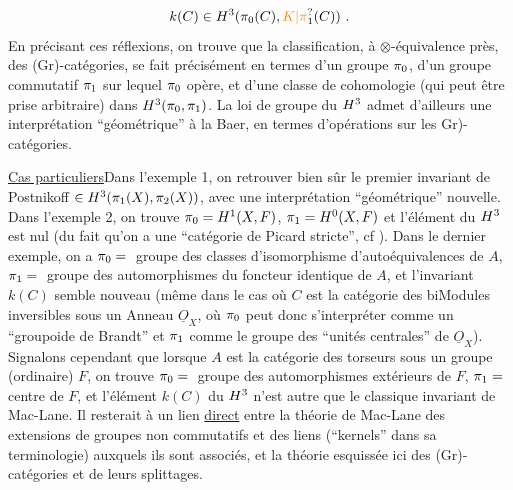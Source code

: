 
\[
k(C)\handwritten{\in}H^{\handwritten{3}}(\handwritten{\pi}_{0}(C),\handwritten{\unsure{K|\pi}}_{1}(C))\ .
\]
En précisant ces réflexions, on trouve que la classification, à $\otimes$-équivalence près, des (Gr)-catégories, se fait précisément en termes d'un groupe $\pi_{0}$, d'un groupe commutatif $\pi_{1}$ sur lequel $\pi_{0}$ opère, et d'une classe de cohomologie (qui peut être prise arbitraire) dans $H^{3}(\pi_{0},\pi_{1})$. La loi de  groupe du $H^{3}$ admet d'ailleurs une interprétation ``géométrique'' à la Baer, en termes d'opérations sur les \handwritten{(}Gr)-catégories.

\uline{Cas particuliers}\quad Dans l'exemple 1, on  retrouver bien sûr le premier invariant de Postnikoff $\in H^{3}(\pi_{1}(X),\pi_{2}(X))$, avec une interprétation ``géo\deleted{(}métrique'' nouvelle. Dans l'exemple 2, on trouve $\pi_{0}=H^{1}(X,F)$, $\pi_{1}=H^{0}(X,F)$\handwritten{,} et l'élément du $H^{3}$ est nul (du fait qu'on a une ``catégorie de Picard stricte'', cf \handwritten{[\, ]}). Dans  le dernier exemple, on a $\pi_{0}={}$ groupe des classes d'isomorphisme d'autoéquivalences de $A$, $\pi_{1}={}$ groupe des automorphismes du foncteur identique de $A$, et l'invariant $k(C)$ semble nouveau (même dans le cas où $C$ est la catégorie des biModules inversibles sous un Anneau $\underline{O}_{X}$, où $\pi_{0}$ peut donc s'interpréter comme un ``groupoide de Brandt'' et $\pi_{1}$ comme le groupe des ``unités centrales'' de $\underline{O}_{X}$). Signalons cependant que lorsque $A$ est la catégorie des torseurs sous un groupe (ordinaire) $F$, on trouve  $\pi_{0}={}$ groupe des automorphismes extérieurs de $F$, $\pi_{1}={}$ centre de $F$, et l'élément $k(C)$ du $H^{3}$ n'est autre que le classique invariant de Mac-Lane. Il resterait à  un lien  \uline{direct} entre la théorie de Mac-Lane des extensions de groupes non commutatifs et des liens (``kernels''\deleted{\unsure{)|,}} dans sa terminologie) auxquels ils sont associés, et la théorie  esquissée ici des (Gr)-catégories et de leurs splittages.

